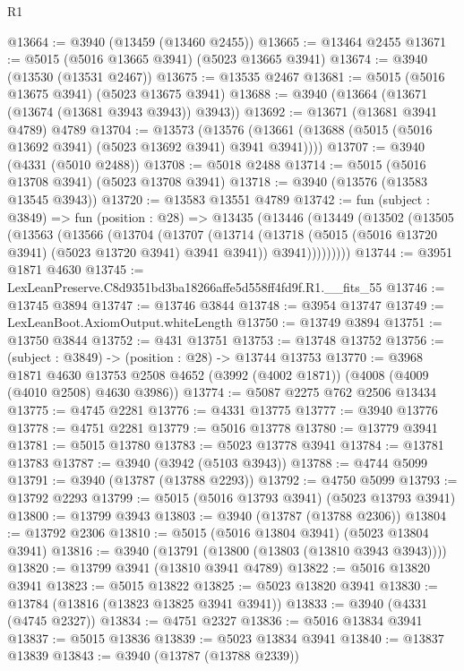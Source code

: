 \begin{lexlean}{R1}
\begin{coremodule}
@13664 := @3940 (@13459 (@13460 @2455))
@13665 := @13464 @2455
@13671 := @5015 (@5016 @13665 @3941) (@5023 @13665 @3941)
@13674 := @3940 (@13530 (@13531 @2467))
@13675 := @13535 @2467
@13681 := @5015 (@5016 @13675 @3941) (@5023 @13675 @3941)
@13688 := @3940 (@13664 (@13671 (@13674 (@13681 @3943 @3943)) @3943))
@13692 := @13671 (@13681 @3941 @4789) @4789
@13704 := @13573
    (@13576 (@13661 (@13688 (@5015 (@5016 @13692 @3941) (@5023 @13692 @3941) @3941 @3941))))
@13707 := @3940 (@4331 (@5010 @2488))
@13708 := @5018 @2488
@13714 := @5015 (@5016 @13708 @3941) (@5023 @13708 @3941)
@13718 := @3940 (@13576 (@13583 @13545 @3943))
@13720 := @13583 @13551 @4789
@13742 := fun (subject : @3849) =>
  fun (position : @28) =>
  @13435
    (@13446
      (@13449
        (@13502
          (@13505
            (@13563
              (@13566
                (@13704
                  (@13707
                    (@13714
                      (@13718 (@5015 (@5016 @13720 @3941) (@5023 @13720 @3941) @3941 @3941))
                      @3941)))))))))
@13744 := @3951 @1871 @4630
@13745 := LexLeanPreserve.C8d9351bd3ba18266affe5d558ff4fd9f.R1.__fits_55
@13746 := @13745 @3894
@13747 := @13746 @3844
@13748 := @3954 @13747
@13749 := LexLeanBoot.AxiomOutput.whiteLength
@13750 := @13749 @3894
@13751 := @13750 @3844
@13752 := @431 @13751
@13753 := @13748 @13752
@13756 := (subject : @3849) -> (position : @28) -> @13744 @13753
@13770 := @3968
    @1871
    @4630
    @13753
    @2508
    @4652
    (@3992 (@4002 @1871))
    (@4008 (@4009 (@4010 @2508) @4630 @3986))
@13774 := @5087 @2275 @762 @2506 @13434
@13775 := @4745 @2281
@13776 := @4331 @13775
@13777 := @3940 @13776
@13778 := @4751 @2281
@13779 := @5016 @13778
@13780 := @13779 @3941
@13781 := @5015 @13780
@13783 := @5023 @13778 @3941
@13784 := @13781 @13783
@13787 := @3940 (@3942 (@5103 @3943))
@13788 := @4744 @5099
@13791 := @3940 (@13787 (@13788 @2293))
@13792 := @4750 @5099
@13793 := @13792 @2293
@13799 := @5015 (@5016 @13793 @3941) (@5023 @13793 @3941)
@13800 := @13799 @3943
@13803 := @3940 (@13787 (@13788 @2306))
@13804 := @13792 @2306
@13810 := @5015 (@5016 @13804 @3941) (@5023 @13804 @3941)
@13816 := @3940 (@13791 (@13800 (@13803 (@13810 @3943 @3943))))
@13820 := @13799 @3941 (@13810 @3941 @4789)
@13822 := @5016 @13820 @3941
@13823 := @5015 @13822
@13825 := @5023 @13820 @3941
@13830 := @13784 (@13816 (@13823 @13825 @3941 @3941))
@13833 := @3940 (@4331 (@4745 @2327))
@13834 := @4751 @2327
@13836 := @5016 @13834 @3941
@13837 := @5015 @13836
@13839 := @5023 @13834 @3941
@13840 := @13837 @13839
@13843 := @3940 (@13787 (@13788 @2339))

\end{coremodule}
\end{lexlean}
